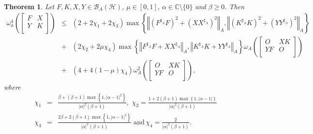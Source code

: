 \documentclass{article}
\newcommand{\bra}[1]{\left(#1\right)}
\newcommand{\normA}[1]{{\left\Vert#1\right\Vert}_{A}}
\newcommand{\abs}[1]{\left\vert#1\right\vert}
\newcommand{\set}[1]{\left\{#1\right\}}
\renewcommand{\c}{\mathbb C}
\newcommand {\A}{\mathbb{A}}
\newcommand {\h}{\mathcal{H}}
\newcommand {\Xa}{X^{\sharp_{A}}}
\renewcommand {\b}{\mathcal{B}}
\newcommand {\Ya}{Y^{\sharp_{A}}}
\newcommand {\Ka}{K^{\sharp_{A}}}
\newcommand {\Fa}{F^{\sharp_{A}}}
\newtheorem{theorem}{Theorem}[section]
\begin{document}
\begin{theorem}\label{Modified KZ}  Let $F,K,X,Y\in\b_A(\h)$, $\mu\in [0,1]$, $\alpha\in\c\setminus\{0\}$ and $\beta\geq 0$. Then
\begin{eqnarray}
 \omega_{\A}^4\bra{\begin{bmatrix} F& X\\ Y& K \\\end{bmatrix}}
   &\leq& \bra{2+2\chi_1+2\chi_3}\max\set{\normA{(\Fa F)^{2}+(X\Xa)^2},\normA{(\Ka K)^{2}+(Y\Ya)^2}}\nonumber\\
     &+& (2\chi_2+2\mu\chi_4)\max\set{\normA{\Fa F+X\Xa},\normA{\Ka K+Y\Ya}}\omega_A\bra{\begin{bmatrix} O& XK\\ YF& O \\\end{bmatrix}}\nonumber\\
     &+& \bra{4+4(1-\mu)\chi_4}\omega_A^2\bra{\begin{bmatrix} O& XK\\ YF& O \\\end{bmatrix}},
\end{eqnarray}
 where
 \begin{eqnarray*}
   \chi_1&=&\frac{\beta+(\beta+1)\max\set{1,\abs{\alpha-1}^2}}{\abs{\alpha}^2(\beta+1)},\,\,
   \chi_2=\frac{1+2(\beta+1)\max\set{1,\abs{\alpha-1}}}{\abs{\alpha}^2(\beta+1)}  \\
   \chi_3&=&\frac{2\beta+2(\beta+1)\max\set{1,\abs{\alpha-1}^2}}{\abs{\alpha}^2(\beta+1)}\,\,\mbox{and}\,\chi_4=\frac{2}{\abs{\alpha}^2(\beta+1)}.
    \end{eqnarray*}
\end{theorem}
\end{document}
